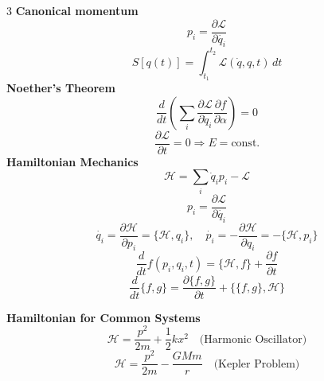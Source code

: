 \documentclass[1pt]{article}
\begin{document}
\begin{multicols}{3}
\textbf{Canonical momentum}
\begin{equation*}
    p_i = \frac{\partial \mathcal{L}}{\partial \dot{q_i}}
\end{equation*}
\begin{equation*}
    S[q(t)] = \int_{t_1}^{t_2} \mathcal{L}(\dot{q},q,t) \, dt
\end{equation*}
\textbf{Noether's Theorem}
\begin{equation*}
    \frac{d}{dt}\left(\sum_i \frac{\partial \mathcal{L}}{\partial \dot{q}_i} \frac{\partial f}{\partial \alpha}\right) = 0
\end{equation*}
\begin{equation*}
    \frac{\partial\mathcal{L}}{\partial t}=0\Rightarrow E=\text{const.}
\end{equation*}
\textbf{Hamiltonian Mechanics}
\begin{equation*}
    \mathcal{H} = \sum_i \dot{q}_i p_i - \mathcal{L}
\end{equation*}
\begin{equation*}
    p_i = \frac{\partial \mathcal{L}}{\partial \dot{q_i}}
\end{equation*}
\begin{equation*}
    \dot{q_i} = \frac{\partial \mathcal{H}}{\partial p_i}=\{\mathcal{H},q_i\}, \quad \dot{p_i} = -\frac{\partial \mathcal{H}}{\partial q_i}=-\{\mathcal{H},p_i\}
\end{equation*}
\[\frac{d}{dt} f \left( p_i, q_i, t \right) = \{ \mathcal{H}, f \} + \frac{\partial f}{\partial t}
\]
\[\frac{d}{dt} \{ f, g \} = \frac{\partial \{ f, g \}}{\partial t} + \{ \{ f, g \}, \mathcal{H} \}
\]

\textbf{Hamiltonian for Common Systems}
\begin{equation*}
   \mathcal{H} = \frac{p^2}{2m} + \frac{1}{2} k x^2 \quad \text{(Harmonic Oscillator)}
\end{equation*}
\begin{equation*}
    \mathcal{H} = \frac{p^2}{2m} - \frac{GMm}{r} \quad \text{(Kepler Problem)}
\end{equation*}


\end{multicols}
\end{document}
